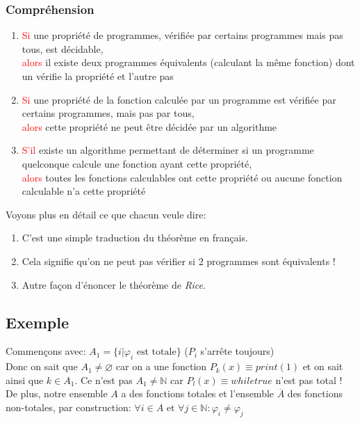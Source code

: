 \documentclass{report}
\begin{document}
\subsubsection{Compréhension}
\begin{enumerate}
\item \textcolor{red}{Si} une propriété de programmes, vérifiée par certains programmes mais pas tous, est décidable, \\
\textcolor{red}{alors} il existe deux programmes équivalents (calculant la même fonction) dont un vérifie la propriété et l'autre pas
\item \textcolor{red}{Si} une propriété de la fonction calculée par un programme est vérifiée par certains programmes, mais pas par tous, \\
\textcolor{red}{alors} cette propriété ne peut être décidée par un algorithme
\item \textcolor{red}{S'il} existe un algorithme permettant de déterminer si un programme quelconque calcule une fonction ayant cette propriété, \\
\textcolor{red}{alors} toutes les fonctions calculables ont cette propriété ou aucune fonction
calculable n’a cette propriété
\end{enumerate}
Voyons plus en détail ce que chacun veule dire:
\begin{enumerate}
\item C'est une simple traduction du théorème en français.
\item Cela signifie qu'on ne peut pas vérifier si 2 programmes sont équivalents !
\item Autre façon d'énoncer le théorème de \textit{Rice}.
\end{enumerate}

\subsection{Exemple}
Commençons avec: $ A_1 = \{i | \varphi_i \text{ est totale}\}$ ($P_i$ s'arrête toujours)\\
Donc on sait que $A_1 \neq \varnothing$ car on a une fonction $P_k(x) \equiv print(1)$ et on sait ainsi que $k \in A_1$. Ce n'est pas $A_1 \neq \mathbb{N}$ car $P_l(x) \equiv while true$ n'est pas total ! De plus, notre ensemble $A$ a des fonctions totales et l'ensemble $\overline{A}$ des fonctions non-totales, par construction: $\forall i \in A \text{ et } \forall j \in \mathbb{N}: \varphi_i \neq \varphi_j$\\
\end{document}
